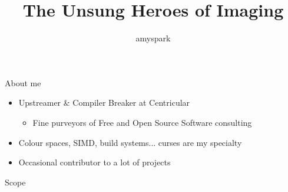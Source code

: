 \documentclass[aspectratio=169,handout]{fireshonks}
\title{The Unsung Heroes of Imaging}
\author{amyspark}
\date{\DTMdate{2023-12-27}}
\begin{document}
\maketitle

\begin{frame}{About me}
  \begin{itemize}[<*>]
    \item Upstreamer \& Compiler Breaker at Centricular
      \begin{itemize}[<*>]
        \item Fine purveyors of Free and Open Source Software consulting
      \end{itemize}
    \item Colour spaces, SIMD, build systems... curses are my specialty 
    \item Occasional contributor to a lot of projects
  \end{itemize}
\end{frame}
\begin{frame}{Scope}
  \tableofcontents
\end{frame}
\end{document}
